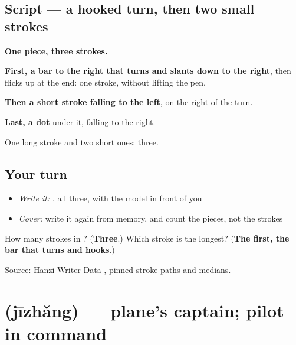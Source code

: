 \subsection*{Script — a hooked turn, then two small strokes}

\begin{quote}
\end{quote}

\textbf{One piece, three strokes.}

\textbf{First, a bar to the right that turns and slants down to the right}, then flicks up at the end: one stroke, without lifting the pen.

\textbf{Then a short stroke falling to the left}, on the right of the turn.

\textbf{Last, a dot} under it, falling to the right.

One long stroke and two short ones: three.

\subsection*{Your turn}
\begin{itemize}
\raggedright
  \item \emph{Write it:} , all three, with the model in front of you
  \item \emph{Cover:} write it again from memory, and count the pieces, not the strokes
\end{itemize}

\begin{tcolorbox}[breakable,colback=teal!4,colframe=teal!35!black,title={Before you move on}]
How many strokes in ? (\textbf{Three}.) Which stroke is the longest? (\textbf{The first, the bar that turns and hooks}.)

Source: \href{https://raw.githubusercontent.com/chanind/hanzi-writer-data/68d10a4b21150cae5e1ebbd223eed289cf32d90c/data/\%E9\%A3\%9E.json}{Hanzi Writer Data , pinned stroke paths and medians}.
\end{tcolorbox}
\section[\texorpdfstring{\zh{机长} (jīzhǎng)}{机长 (jīzhǎng)}]{ (jīzhǎng) — plane's captain; pilot in command}

\label{lesson:ZH-C413-jizhang}



